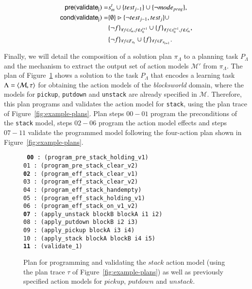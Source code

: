 \begin{small}
	\begin{align*}
	\hspace*{7pt}\mathsf{pre}(\mathsf{validate_{j}})=&s_m^t\cup\{test_{j-1}\}\cup \{\neg mode_{prog}\},\\
	\mathsf{cond}(\mathsf{validate_{j}})=&\{\emptyset\}\rhd\{\neg test_{j-1},test_j\} \cup \\
	&\{\neg f\}_{\forall f\in s_m^t, f \notin s_0^{t+1}}\cup \{f\}_{\forall f\in s_0^{t+1}, f \notin s_m^t},\\
	&\{\neg f\}_{\forall f\in F_{\pi_t}}\cup \{f\}_{\forall f\in F_{\pi_{t+1}}}.\\
	\end{align*}
\end{small}

Finally, we will detail the composition of a solution plan $\pi_\Lambda$ to a planning task $P_\Lambda$ and the mechanism to extract the output set of action models $\mathcal{M}'$ from $\pi_\Lambda$. The plan of Figure~\ref{fig:plan-lplan} shows a solution to the task $P_{\Lambda}$ that encodes a learning task $\Lambda={\langle \mathcal{M},\tau \rangle}$ for obtaining the action models of the {\em blocksworld} domain, where the models for {\tt\small pickup}, {\tt\small putdown} and {\tt\small unstack} are already specified in $\mathcal{M}$. Therefore, this plan programs and validates the action model for {\tt\small stack}, using the plan trace of Figure~\ref{fig:example-plans}. Plan steps $00-01$ program the preconditions of the {\tt\small stack} model, steps $02-06$ program the action model effects and steps $07-11$ validate the programmed model following the four-action plan shown in Figure~\ref{fig:example-plans}.

\begin{figure}[hbt!]
	{\footnotesize\tt
		{\bf 00} : (program\_pre\_stack\_holding\_v1) \\
		01 : (program\_pre\_stack\_clear\_v2)\\
		{\bf 02} : (program\_eff\_stack\_clear\_v1)\\
		03 : (program\_eff\_stack\_clear\_v2)\\
		04 : (program\_eff\_stack\_handempty)\\
		05 : (program\_eff\_stack\_holding\_v1)\\
		06 : (program\_eff\_stack\_on\_v1\_v2)\\
		{\bf 07} : (apply\_unstack blockB blockA i1 i2)\\
		08 : (apply\_putdown blockB i2 i3)\\
		09 : (apply\_pickup blockA i3 i4)\\
		10 : (apply\_stack blockA blockB i4 i5)\\
		{\bf 11} : (validate\_1)
	}
	\caption{\small Plan for programming and validating the $stack$ action model (using the plan trace $\tau$ of Figure~\ref{fig:example-plans}) as well as previously specified action models for $pickup$, $putdown$ and $unstack$.}
	\label{fig:plan-lplan}
\end{figure}


